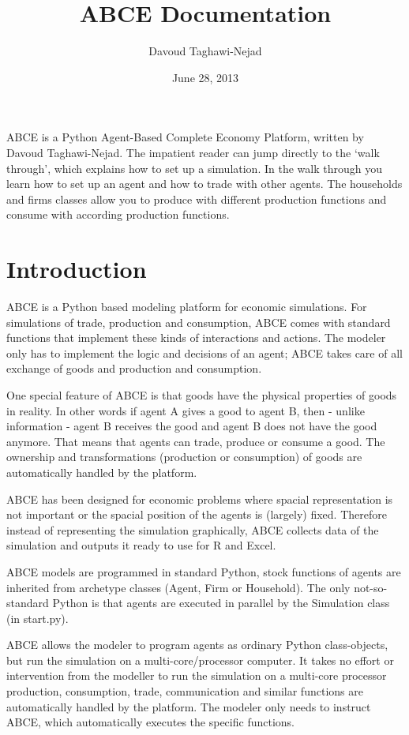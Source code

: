 \documentclass[letterpaper,10pt,english]{sphinxmanual}
\title{ABCE Documentation}
\date{June 28, 2013}
\author{Davoud Taghawi-Nejad}
\begin{document}
\maketitle
\tableofcontents
{}\label{index::doc}


ABCE is a Python Agent-Based Complete Economy Platform, written by Davoud Taghawi-Nejad.
The impatient reader can jump directly to the `walk through', which explains how to
set up a simulation. In the walk through you learn
how to set up an agent and how to trade with other agents. The households and firms
classes allow you to produce with different production functions and consume with according
production functions.


\chapter{Introduction}
\label{introduction:welcome-to-abce-s-documentation}\label{introduction:introduction}\label{introduction::doc}
ABCE is a Python based modeling platform for economic simulations.
For simulations of trade, production and consumption, ABCE comes
with standard functions that implement these kinds of interactions
and actions. The modeler only has to implement
the logic and decisions of an agent; ABCE takes care of all exchange
of goods and production and consumption.

One special feature of ABCE is that goods have the physical properties of
goods in reality. In other words if agent A gives a good to agent B, then
- unlike information - agent B receives the good and agent B does not have
the good anymore. That means that agents can trade, produce or consume a good.
The ownership and transformations (production or consumption) of goods are
automatically handled by the platform.

ABCE has been designed for economic problems where spacial representation
is not important or the spacial position of the agents is (largely) fixed.
Therefore instead of representing the simulation graphically, ABCE collects
data of the simulation and outputs it ready to use for R and Excel.

ABCE models are programmed in standard Python, stock functions of agents
are inherited from archetype classes (Agent, Firm or Household). The only
not-so-standard Python is that agents are executed in parallel by the
Simulation class (in start.py).

ABCE allows the modeler to program agents as ordinary Python class-objects,
but run the simulation on a multi-core/processor computer. It takes no
effort or intervention from the modeller to run the simulation on a
multi-core processor production,
consumption, trade, communication and similar functions are automatically
handled by the platform. The modeler only needs to instruct ABCE, which
automatically executes the specific functions.
\end{document}
